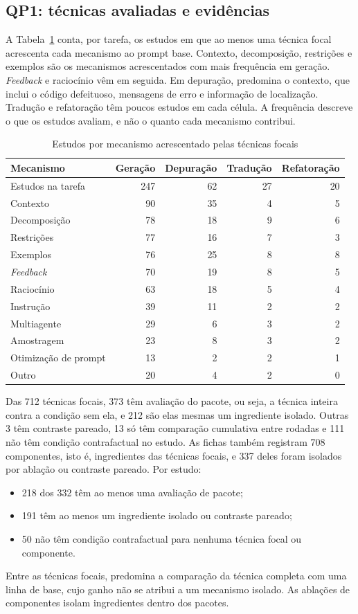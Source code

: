 \subsection{QP1: técnicas avaliadas e evidências}\label{sec:qp1}
A Tabela~\ref{tab:mecanismos} conta, por tarefa, os estudos em que ao menos uma técnica focal acrescenta cada
mecanismo ao prompt base. Contexto, decomposição, restrições e exemplos são os mecanismos acrescentados com mais frequência em geração. \textit{Feedback} e raciocínio vêm em seguida. Em depuração, predomina o contexto, que inclui
o código defeituoso, mensagens de erro e informação de localização. Tradução e refatoração têm poucos estudos em
cada célula. A frequência descreve o que os estudos avaliam, e não o quanto cada mecanismo contribui.

\begin{table}[!t]
\caption{Estudos por mecanismo acrescentado pelas técnicas focais}\label{tab:mecanismos}
\centering\footnotesize
\setlength{\tabcolsep}{4pt}
\begin{tabular}{@{}lrrrr@{}}
\hline
Mecanismo & Geração & Depuração & Tradução & Refatoração\\
\hline
Estudos na tarefa & 247 & 62 & 27 & 20\\
\hline
Contexto & 90 & 35 & 4 & 5\\
Decomposição & 78 & 18 & 9 & 6\\
Restrições & 77 & 16 & 7 & 3\\
Exemplos & 76 & 25 & 8 & 8\\
\textit{Feedback} & 70 & 19 & 8 & 5\\
Raciocínio & 63 & 18 & 5 & 4\\
Instrução & 39 & 11 & 2 & 2\\
Multiagente & 29 & 6 & 3 & 2\\
Amostragem & 23 & 8 & 3 & 2\\
Otimização de prompt & 13 & 2 & 2 & 1\\
Outro & 20 & 4 & 2 & 0\\
\hline
\end{tabular}
\end{table}

Das 712 técnicas focais, 373 têm avaliação do pacote, ou seja, a técnica inteira contra a condição sem ela, e 212
são elas mesmas um ingrediente isolado. Outras 3 têm contraste pareado, 13 só têm comparação cumulativa entre
rodadas e 111 não têm condição contrafactual no estudo. As fichas também registram 708 componentes, isto é,
ingredientes das técnicas focais, e 337 deles foram isolados por ablação ou contraste pareado. Por estudo:
\begin{itemize}
  \item 218 dos 332 têm ao menos uma avaliação de pacote;
  \item 191 têm ao menos um ingrediente isolado ou contraste pareado;
  \item 50 não têm condição contrafactual para nenhuma técnica focal ou componente.
\end{itemize}
Entre as técnicas focais, predomina a comparação da técnica completa com uma linha de base, cujo ganho não se
atribui a um mecanismo isolado. As ablações de componentes isolam ingredientes dentro dos pacotes.

